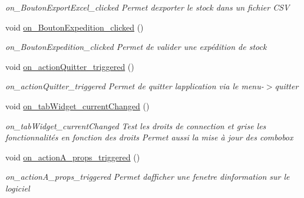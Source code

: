 \begin{DoxyCompactItemize}
\begin{DoxyCompactList}\small\item\em on\+\_\+\+Bouton\+Export\+Excel\+\_\+clicked Permet d\textquotesingle{}exporter le stock dans un fichier C\+SV \end{DoxyCompactList}\item 
\mbox{\label{class_main_window_a4a590e5fa40398c1c7df3512cfb4c90c}} 
void \mbox{\hyperlink{class_main_window_a4a590e5fa40398c1c7df3512cfb4c90c}{on\+\_\+\+Bouton\+Expedition\+\_\+clicked}} ()
\begin{DoxyCompactList}\small\item\em on\+\_\+\+Bouton\+Expedition\+\_\+clicked Permet de valider une expédition de stock \end{DoxyCompactList}\item 
\mbox{\label{class_main_window_afe9d9d46e61e2460e636619577a9e8fd}} 
void \mbox{\hyperlink{class_main_window_afe9d9d46e61e2460e636619577a9e8fd}{on\+\_\+action\+Quitter\+\_\+triggered}} ()
\begin{DoxyCompactList}\small\item\em on\+\_\+action\+Quitter\+\_\+triggered Permet de quitter l\textquotesingle{}application via le menu-\/$>$quitter \end{DoxyCompactList}\item 
\mbox{\label{class_main_window_a56c9b3f6e209838a20cf6f7da29df0a2}} 
void \mbox{\hyperlink{class_main_window_a56c9b3f6e209838a20cf6f7da29df0a2}{on\+\_\+tab\+Widget\+\_\+current\+Changed}} ()
\begin{DoxyCompactList}\small\item\em on\+\_\+tab\+Widget\+\_\+current\+Changed Test les droits de connection et grise les fonctionnalités en fonction des droits Permet aussi la mise à jour des combobox \end{DoxyCompactList}\item 
\mbox{\label{class_main_window_ab1682c84d2e179b6e33b79b1506ee0da}} 
void \mbox{\hyperlink{class_main_window_ab1682c84d2e179b6e33b79b1506ee0da}{on\+\_\+action\+A\+\_\+props\+\_\+triggered}} ()
\begin{DoxyCompactList}\small\item\em on\+\_\+action\+A\+\_\+props\+\_\+triggered Permet d\textquotesingle{}afficher une fenetre d\textquotesingle{}information sur le logiciel \end{DoxyCompactList}\item 

\end{DoxyCompactItemize}
